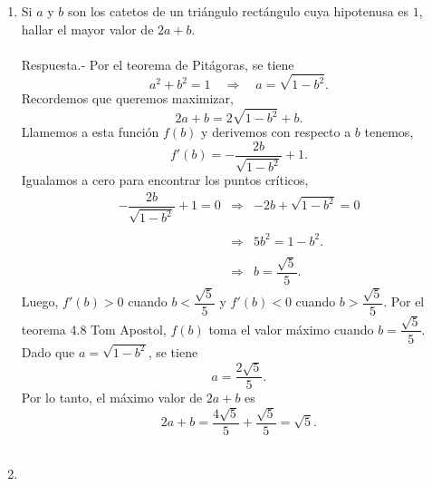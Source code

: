 \begin{enumerate}[\bfseries 1.]
    \item Si $a$ y $b$ son los catetos de un triángulo rectángulo cuya hipotenusa es $1$, hallar el mayor valor de $2a + b$.\\\\
	Respuesta.-\; Por el teorema de Pitágoras, se tiene
	$$a^2+b^2=1\quad \Rightarrow \quad a=\sqrt{1-b^2}.$$
	Recordemos que queremos maximizar,
	$$2a+b=2\sqrt{1-b^2}+b.$$
	Llamemos a esta función $f(b)$ y derivemos con respecto a $b$ tenemos,
	$$f'(b)=-\dfrac{2b}{\sqrt{1-b^2}}+1.$$
	Igualamos a cero para encontrar los puntos críticos,
	$$\begin{array}{rcl}
	    -\dfrac{2b}{\sqrt{1-b^2}}+1=0 &\Rightarrow& -2b+\sqrt{1-b^2}=0\\\\
	    &\Rightarrow& 5b^2=1-b^2.\\\\
	    &\Rightarrow& b=\dfrac{\sqrt{5}}{5}.
	\end{array}$$
	Luego, $f'(b)>0$ cuando $b<\dfrac{\sqrt{5}}{5}$ y $f'(b)<0$ cuando $b>\dfrac{\sqrt{5}}{5}$. Por el teorema 4.8 Tom Apostol, $f(b)$ toma el valor máximo cuando $b=\dfrac{\sqrt{5}}{5}$. 
	Dado que $a=\sqrt{1-b^2}$, se tiene
	$$a=\dfrac{2\sqrt{5}}{5}.$$
	Por lo tanto, el máximo valor de $2a+b$ es
	$$2a+b=\dfrac{4\sqrt{5}}{5}+\dfrac{\sqrt{5}}{5}=\sqrt{5}.$$\\

    \item 



\end{enumerate}



